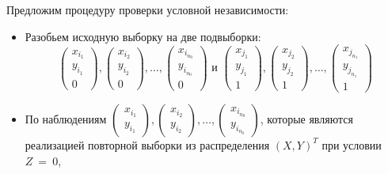 Предложим процедуру проверки условной независимости:
\begin{itemize}
    \item Разобьем исходную выборку на две подвыборки:
    $$
    \begin{pmatrix}
            x_{i_1} \\
            y_{i_1} \\
            0
        \end{pmatrix},
        \begin{pmatrix}
            x_{i_2} \\
            y_{i_2} \\
            0
        \end{pmatrix}, \ldots,
        \begin{pmatrix}
            x_{i_{n_0}} \\
            y_{i_{n_0}} \\
            0
        \end{pmatrix}
    \text{ и }
    \begin{pmatrix}
            x_{j_1} \\
            y_{j_1} \\
            1
        \end{pmatrix},
        \begin{pmatrix}
            x_{j_2} \\
            y_{j_2} \\
            1
        \end{pmatrix}, \ldots,
        \begin{pmatrix}
            x_{j_{n_1}} \\
            y_{j_{n_1}} \\
            1
        \end{pmatrix}
    $$
    \item По наблюдениям 
    $
    \begin{pmatrix}
        x_{i_1} \\
        y_{i_1} 
    \end{pmatrix},
    \begin{pmatrix}
        x_{i_2} \\
        y_{i_2}
    \end{pmatrix}, \ldots,
    \begin{pmatrix}
        x_{i_{n_0}} \\
        y_{i_{n_0}}
    \end{pmatrix}
    $, которые являются реализацией повторной выборки
    из распределения $(X,Y)^T$ при условии $Z~=~0$,

\end{itemize}
